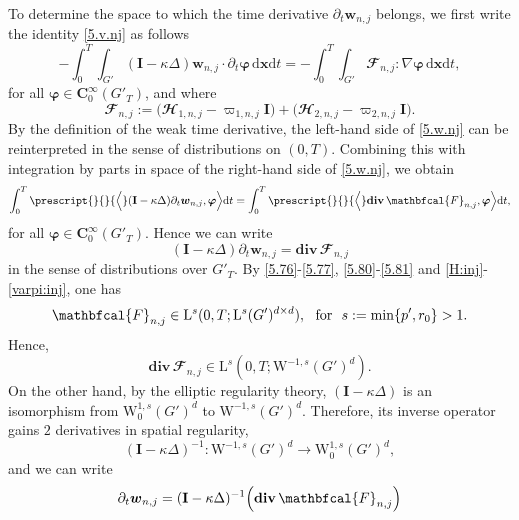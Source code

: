 \documentclass[12pt,reqno]{amsart}
\numberwithin{equation}{section}
\let\originalleft\left
\let\originalright\right
\renewcommand{\left}{\mathopen{}\mathclose\bgroup\originalleft}
\renewcommand{\right}{\aftergroup\egroup\originalright}
\theoremstyle{definition}
\def\dxt{\,\mathrm{d}\boldsymbol{x}\mathrm{d}t}
\def\divv{\mathbf{div}\,}
\def\W{\mathrm{W}}
\def\L{\mathrm{L}}
\def\w{\boldsymbol{w}}
\def\bfC{\mathbf{C}}
\def\bfI{\mathbf{I}}
\def\bfi{\boldsymbol{\varphi}}
\def\bcH{\mathbfcal{H}}
\def\bcF{\mathbfcal{F}}
\begin{document}
{{{To determine the space to which the time derivative $\partial_t \w_{n,j}$ belongs, we first write the identity \eqref{5.v.nj} as follows
\begin{equation}\label{5.w.nj}
-\!\int_{0}^{T}\!\!\!\int_{G'}(\bfI-\kappa \Delta)\w_{n,j}\cdot{\partial_t\bfi} \dxt = -\!\int_{0}^{T}\!\!\!\int_{G'}\bcF_{n,j}:\nabla\bfi \dxt,
\end{equation}
for all $\bfi \in \bfC_0^\infty(G'_T)$, and where
\begin{equation}\label{F:n:j}
\bcF_{n,j} := \big(\bcH_{1,n,j}-\varpi_{1,n,j}\bfI\big) + \big(\bcH_{2,n,j} - \varpi_{2,n,j}\bfI\big).
\end{equation}
By the definition of the weak time derivative, the left-hand side of \eqref{5.w.nj} can be reinterpreted in the sense of distributions on $(0,T)$.
Combining this with integration by parts in space of the right-hand side of \eqref{5.w.nj}, we obtain
\begin{equation*}
\int_{0}^{T} \prescript{}{}{\Big\langle} (\bfI-\kappa \Delta)\partial_t\w_{n,j}, \bfi \Big\rangle \mathrm{d}t=
\int_{0}^{T} \prescript{}{}{\Big\langle} \mathbf{div}\,\bcF_{n,j}, \bfi \Big\rangle \mathrm{d}t,
\end{equation*}
for all $\bfi \in \bfC^\infty_0(G'_T)$.
Hence we can write
\begin{equation}\label{duality:F:n:j}
(\bfI - \kappa \Delta)\partial_t\w_{n,j} = \mathbf{div}\,\bcF_{n,j}
\end{equation}
in the sense of distributions over $G'_T$.
By \eqref{5.76}-\eqref{5.77}, \eqref{5.80}-\eqref{5.81} and \eqref{H:inj}-\eqref{varpi:inj}, one has
\begin{equation}\label{F:n:j:Ls}
\bcF_{n,j} \in \L^s(0,T; \L^s(G')^{d\times d}),\, \, \text{ for } \,\,  s:=\min\left\{p',r_0\right\}>1.
\end{equation}
Hence,
\begin{equation*}
\divv\bcF_{n,j} \in \L^s(0,T; \W^{-1,s}(G')^{d}).
\end{equation*}
On the other hand, by the elliptic regularity theory, $(\bfI - \kappa \Delta)$ is an isomorphism from $\W^{1,s}_0(G')^d$ to $\W^{-1,s}(G')^d$.
Therefore, its inverse operator gains $2$ derivatives in spatial regularity,
\begin{equation*}
(\bfI - \kappa \Delta)^{-1} : \W^{-1,s}(G')^d \longrightarrow \W^{1,s}_0(G')^d,
\end{equation*}
and we can write
\begin{equation*}
\partial_t\w_{n,j} = (\bfI - \kappa \Delta)^{-1} \left( \mathbf{div}\,\bcF_{n,j} \right)

\end{equation*}}}}
\end{document}
